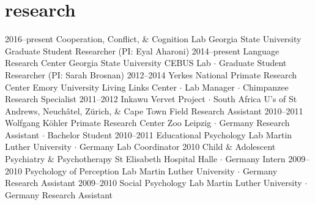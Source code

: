 \documentclass[]{friggeri-cv}
\begin{document}

\section{research}

\begin{entrylist}
  \entry
    {2016--present}
    {Cooperation, Conflict, \& Cognition Lab}
    {Georgia State University}
    {Graduate Student Researcher (PI: Eyal Aharoni)}
  \entry
    {2014--present}
    {Language Research Center}
    {Georgia State University}
    {CEBUS Lab $\cdot$ Graduate Student Researcher (PI: Sarah Brosnan)}
  \entry
    {2012--2014}
    {Yerkes National Primate Research Center}
    {Emory University}
    {Living Links Center $\cdot$ Lab Manager $\cdot$ Chimpanzee Research Specialist}
  \entry
    {2011--2012}
    {Inkawu Vervet Project $\cdot$ South Africa}
    {U's of St Andrews, Neuch\^{a}tel, Z\"urich, \& Cape Town}
    {Field Research Assistant}
  \entry
    {2010--2011}
    {Wolfgang K\"{o}hler Primate Research Center}
    {Zoo Leipzig $\cdot$ Germany}
    {Research Assistant $\cdot$ Bachelor Student}
  \entry
    {2010--2011}
    {Educational Psychology Lab}
    {Martin Luther University $\cdot$ Germany}
    {Lab Coordinator}
  \entry
    {2010}
    {Child \& Adolescent Psychiatry \& Psychotherapy}
    {St Elisabeth Hospital Halle $\cdot$ Germany}
    {Intern}
  \entry
    {2009--2010}
    {Psychology of Perception Lab}
    {Martin Luther University $\cdot$ Germany}
    {Research Assistant}
  \entry
    {2009--2010}
    {Social Psychology Lab}
    {Martin Luther University $\cdot$ Germany}
    {Research Assistant}
\end{entrylist}%


\end{document}
